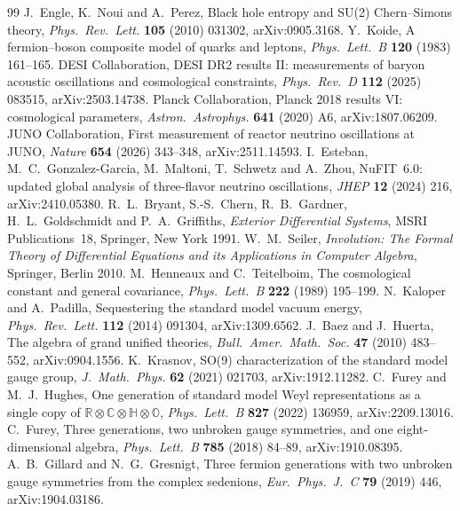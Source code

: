 \documentclass[11pt]{article}
\theoremstyle{definition}
\theoremstyle{remark}
\begin{document}
\begin{thebibliography}{99}
 J.~Engle, K.~Noui and A.~Perez, Black hole entropy and SU(2) Chern--Simons theory, \emph{Phys.\ Rev.\ Lett.} \textbf{105} (2010) 031302, arXiv:0905.3168.
 Y.~Koide, A fermion--boson composite model of quarks and leptons, \emph{Phys.\ Lett.\ B} \textbf{120} (1983) 161--165.
 DESI Collaboration, DESI DR2 results II: measurements of baryon acoustic oscillations and cosmological constraints, \emph{Phys.\ Rev.\ D} \textbf{112} (2025) 083515, arXiv:2503.14738.
 Planck Collaboration, Planck 2018 results VI: cosmological parameters, \emph{Astron.\ Astrophys.} \textbf{641} (2020) A6, arXiv:1807.06209.
 JUNO Collaboration, First measurement of reactor neutrino oscillations at JUNO, \emph{Nature} \textbf{654} (2026) 343--348, arXiv:2511.14593.
 I.~Esteban, M.~C.~Gonzalez-Garcia, M.~Maltoni, T.~Schwetz and A.~Zhou, NuFIT~6.0: updated global analysis of three-flavor neutrino oscillations, \emph{JHEP} \textbf{12} (2024) 216, arXiv:2410.05380.
 R.~L.~Bryant, S.-S.~Chern, R.~B.~Gardner, H.~L.~Goldschmidt and P.~A.~Griffiths, \emph{Exterior Differential Systems}, MSRI Publications~18, Springer, New York 1991.
 W.~M.~Seiler, \emph{Involution: The Formal Theory of Differential Equations and its Applications in Computer Algebra}, Springer, Berlin 2010.
 M.~Henneaux and C.~Teitelboim, The cosmological constant and general covariance, \emph{Phys.\ Lett.\ B} \textbf{222} (1989) 195--199.
 N.~Kaloper and A.~Padilla, Sequestering the standard model vacuum energy, \emph{Phys.\ Rev.\ Lett.} \textbf{112} (2014) 091304, arXiv:1309.6562.
 J.~Baez and J.~Huerta, The algebra of grand unified theories, \emph{Bull.\ Amer.\ Math.\ Soc.} \textbf{47} (2010) 483--552, arXiv:0904.1556.
 K.~Krasnov, SO(9) characterization of the standard model gauge group, \emph{J.\ Math.\ Phys.} \textbf{62} (2021) 021703, arXiv:1912.11282.
 C.~Furey and M.~J.~Hughes, One generation of standard model Weyl representations as a single copy of \(\mathbb R\otimes\mathbb C\otimes\mathbb H\otimes\mathbb O\), \emph{Phys.\ Lett.\ B} \textbf{827} (2022) 136959, arXiv:2209.13016.
 C.~Furey, Three generations, two unbroken gauge symmetries, and one eight-dimensional algebra, \emph{Phys.\ Lett.\ B} \textbf{785} (2018) 84--89, arXiv:1910.08395.
 A.~B.~Gillard and N.~G.~Gresnigt, Three fermion generations with two unbroken gauge symmetries from the complex sedenions, \emph{Eur.\ Phys.\ J.\ C} \textbf{79} (2019) 446, arXiv:1904.03186.

\end{thebibliography}
\end{document}
